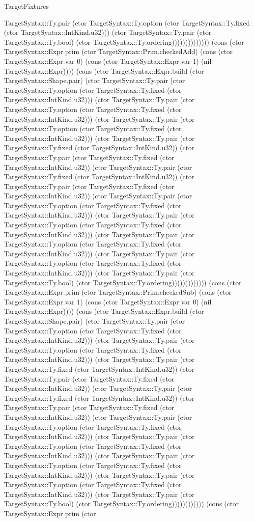 \begin{lexlean}{TargetFixtures}
\begin{semanticmodule}
{TargetSyntax::Ty.pair (ctor TargetSyntax::Ty.option (ctor TargetSyntax::Ty.fixed (ctor TargetSyntax::IntKind.u32))) (ctor TargetSyntax::Ty.pair (ctor TargetSyntax::Ty.bool) (ctor TargetSyntax::Ty.ordering)))))))))))))) (cons (ctor TargetSyntax::Expr.prim (ctor TargetSyntax::Prim.checkedAdd) (cons (ctor TargetSyntax::Expr.var 0) (cons (ctor TargetSyntax::Expr.var 1) (nil TargetSyntax::Expr)))) (cons (ctor TargetSyntax::Expr.build (ctor TargetSyntax::Shape.pair) (ctor TargetSyntax::Ty.pair (ctor TargetSyntax::Ty.option (ctor TargetSyntax::Ty.fixed (ctor TargetSyntax::IntKind.u32))) (ctor TargetSyntax::Ty.pair (ctor TargetSyntax::Ty.option (ctor TargetSyntax::Ty.fixed (ctor TargetSyntax::IntKind.u32))) (ctor TargetSyntax::Ty.pair (ctor TargetSyntax::Ty.option (ctor TargetSyntax::Ty.fixed (ctor TargetSyntax::IntKind.u32))) (ctor TargetSyntax::Ty.pair (ctor TargetSyntax::Ty.fixed (ctor TargetSyntax::IntKind.u32)) (ctor TargetSyntax::Ty.pair (ctor TargetSyntax::Ty.fixed (ctor TargetSyntax::IntKind.u32)) (ctor TargetSyntax::Ty.pair (ctor TargetSyntax::Ty.fixed (ctor TargetSyntax::IntKind.u32)) (ctor TargetSyntax::Ty.pair (ctor TargetSyntax::Ty.fixed (ctor TargetSyntax::IntKind.u32)) (ctor TargetSyntax::Ty.pair (ctor TargetSyntax::Ty.option (ctor TargetSyntax::Ty.fixed (ctor TargetSyntax::IntKind.u32))) (ctor TargetSyntax::Ty.pair (ctor TargetSyntax::Ty.option (ctor TargetSyntax::Ty.fixed (ctor TargetSyntax::IntKind.u32))) (ctor TargetSyntax::Ty.pair (ctor TargetSyntax::Ty.option (ctor TargetSyntax::Ty.fixed (ctor TargetSyntax::IntKind.u32))) (ctor TargetSyntax::Ty.pair (ctor TargetSyntax::Ty.option (ctor TargetSyntax::Ty.fixed (ctor TargetSyntax::IntKind.u32))) (ctor TargetSyntax::Ty.pair (ctor TargetSyntax::Ty.bool) (ctor TargetSyntax::Ty.ordering))))))))))))) (cons (ctor TargetSyntax::Expr.prim (ctor TargetSyntax::Prim.checkedSub) (cons (ctor TargetSyntax::Expr.var 1) (cons (ctor TargetSyntax::Expr.var 0) (nil TargetSyntax::Expr)))) (cons (ctor TargetSyntax::Expr.build (ctor TargetSyntax::Shape.pair) (ctor TargetSyntax::Ty.pair (ctor TargetSyntax::Ty.option (ctor TargetSyntax::Ty.fixed (ctor TargetSyntax::IntKind.u32))) (ctor TargetSyntax::Ty.pair (ctor TargetSyntax::Ty.option (ctor TargetSyntax::Ty.fixed (ctor TargetSyntax::IntKind.u32))) (ctor TargetSyntax::Ty.pair (ctor TargetSyntax::Ty.fixed (ctor TargetSyntax::IntKind.u32)) (ctor TargetSyntax::Ty.pair (ctor TargetSyntax::Ty.fixed (ctor TargetSyntax::IntKind.u32)) (ctor TargetSyntax::Ty.pair (ctor TargetSyntax::Ty.fixed (ctor TargetSyntax::IntKind.u32)) (ctor TargetSyntax::Ty.pair (ctor TargetSyntax::Ty.fixed (ctor TargetSyntax::IntKind.u32)) (ctor TargetSyntax::Ty.pair (ctor TargetSyntax::Ty.option (ctor TargetSyntax::Ty.fixed (ctor TargetSyntax::IntKind.u32))) (ctor TargetSyntax::Ty.pair (ctor TargetSyntax::Ty.option (ctor TargetSyntax::Ty.fixed (ctor TargetSyntax::IntKind.u32))) (ctor TargetSyntax::Ty.pair (ctor TargetSyntax::Ty.option (ctor TargetSyntax::Ty.fixed (ctor TargetSyntax::IntKind.u32))) (ctor TargetSyntax::Ty.pair (ctor TargetSyntax::Ty.option (ctor TargetSyntax::Ty.fixed (ctor TargetSyntax::IntKind.u32))) (ctor TargetSyntax::Ty.pair (ctor TargetSyntax::Ty.bool) (ctor TargetSyntax::Ty.ordering)))))))))))) (cons (ctor TargetSyntax::Expr.prim (ctor }
\end{semanticmodule}
\end{lexlean}

